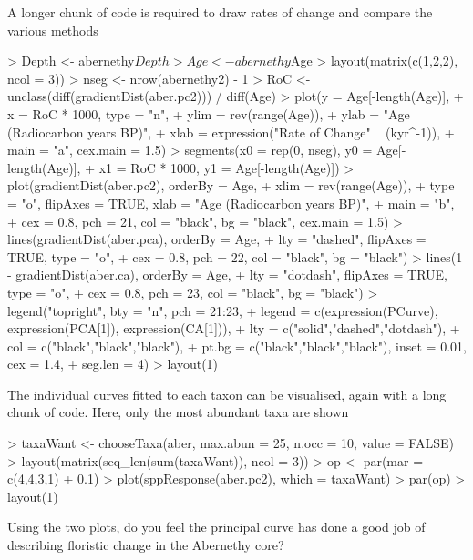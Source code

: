 \documentclass[a4paper,10pt]{article}
\begin{document}
A longer chunk of code is required to draw rates of change and compare the
various methods
\begin{Schunk}
\begin{Sinput}
> Depth <- abernethy$Depth
> Age <- abernethy$Age
> layout(matrix(c(1,2,2), ncol = 3))
> nseg <- nrow(abernethy2) - 1
> RoC <- unclass(diff(gradientDist(aber.pc2))) / diff(Age)
> plot(y = Age[-length(Age)],
+      x = RoC * 1000, type = "n",
+      ylim = rev(range(Age)),
+      ylab = "Age (Radiocarbon years BP)",
+      xlab  = expression("Rate of Change" ~ (kyr^{-1})),
+      main = "a", cex.main = 1.5)
> segments(x0 = rep(0, nseg), y0 = Age[-length(Age)],
+          x1 = RoC * 1000, y1 = Age[-length(Age)])
> plot(gradientDist(aber.pc2), orderBy = Age,
+      xlim = rev(range(Age)),
+      type = "o", flipAxes = TRUE, xlab = "Age (Radiocarbon years BP)",
+      main = "b",
+      cex = 0.8, pch = 21, col = "black", bg = "black", cex.main = 1.5)
> lines(gradientDist(aber.pca), orderBy = Age,
+       lty = "dashed", flipAxes = TRUE, type = "o",
+       cex = 0.8, pch = 22, col = "black", bg = "black")
> lines(1 - gradientDist(aber.ca), orderBy = Age,
+       lty = "dotdash", flipAxes = TRUE, type = "o",
+       cex = 0.8, pch = 23, col = "black", bg = "black")
> legend("topright", bty = "n", pch = 21:23,
+        legend = c(expression(PCurve), expression(PCA[1]), expression(CA[1])),
+        lty = c("solid","dashed","dotdash"),
+        col = c("black","black","black"),
+        pt.bg = c("black","black","black"), inset = 0.01, cex = 1.4,
+        seg.len = 4)
> layout(1)
\end{Sinput}
\end{Schunk}

The individual curves fitted to each taxon can be visualised, again with a long
chunk of code. Here, only the most abundant taxa are shown
\begin{Schunk}
\begin{Sinput}
> taxaWant <- chooseTaxa(aber, max.abun = 25, n.occ = 10, value = FALSE)
> layout(matrix(seq_len(sum(taxaWant)), ncol = 3))
> op <- par(mar = c(4,4,3,1) + 0.1)
> plot(sppResponse(aber.pc2), which = taxaWant)
> par(op)
> layout(1)
\end{Sinput}
\end{Schunk}

Using the two plots, do you feel the principal curve has done a good job of
describing floristic change in the Abernethy core?
\end{document}
